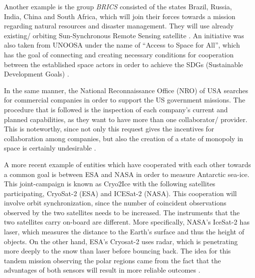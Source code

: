Another example is the group \textit{BRICS} consisted of the states Brazil, Russia, India, China and South Africa, which will join their forces towards a mission regarding natural resources and disaster management. They will use already existing/ orbiting Sun-Synchronous Remote Sensing satellite \cite{BRICS}. An initiative was also taken from UNOOSA under the name of \hspace{1mm} “Access to Space for All”, which has the goal of connecting and creating necessary conditions for cooperation between the established space actors in order to achieve the SDGs (Sustainable Development Goals) \cite{UNOOSA}.

In the same manner, the National Reconnaissance Office (NRO) of USA searches for commercial companies in order to support the US government missions. The procedure that is followed is the inspection of each company's current and planned capabilities, as they want to have more than one collaborator/ provider. This is noteworthy, since not only this request gives the incentives for collaboration among companies, but also the creation of a state of monopoly in space is certainly undesirable \cite{NRO}.

A more recent example of entities which have cooperated with each other towards a common goal is between ESA and NASA in order to measure Antarctic sea-ice. This joint-campaign is known as Cryo2Ice with the following satellites participating, CryoSat-2 (ESA) and ICESat-2 (NASA). This cooperation will involve orbit synchronization, since the number of coincident observations observed by the two satellites needs to be increased. The instruments that the two satellites carry on-board are different. More specifically, NASA's IceSat-2 has laser, which measures the distance to the Earth's surface and thus the height of objects. On the other hand, ESA's Cryosat-2 uses radar, which is penetrating more deeply to the snow than laser before bouncing back. The idea for this tandem mission observing the polar regions came from the fact that the advantages of both sensors will result in more reliable outcomes \cite{Cryo2ice_news, Cryo2ice}.

